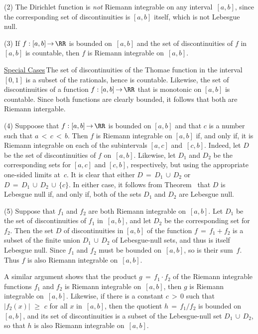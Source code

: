 \V

        (2) The Dirichlet function is {\em not} Riemann integrable on any interval~$[a,b]$, since the corresponding set of discontinuities is $[a,b]$ itself, which is not Lebesgue null.

\V

        (3) If $f:[a,b] \,{\rightarrow}\, {\RR}$ is bounded on~$[a,b]$ and the set of discontinuities of $f$ in~$[a,b]$ is countable, then $f$ is Riemann integrable on~$[a,b]$.

        \underline{Special Cases}\,The set of discontinuities of the Thomae function in the interval $[0,1]$ is a subset of the rationals, hence is countable.
    Likewise, the set of discontinuities of a function $f:[a,b] \,{\rightarrow}\, {\RR}$ that is monotonic on $[a,b]$ is countable.
    Since both functions are clearly bounded, it follows that both are Riemann intergable.

\V

        (4) Suppoose that $f:[a,b] \,{\rightarrow}\, {\RR}$ is bounded on $[a,b]$ and that $c$ is a number such that $a\,<\,c\,<\,b$.
    Then $f$ is Riemann integrable on $[a,b]$ if, and only if, it is Riemann integrable on each of the subintervals $[a,c]$ and~$[c,b]$.
    Indeed, let $D$ be the  set of discontinuities of $f$ on~$[a,b]$. Likewise, let $D_{1}$ and $D_{2}$ be the corresponding sets for $[a,c]$ and $[c,b]$,
    respectively, but using the appropriate one-sided limits at~$c$. It is clear that either $D \,=\, D_{1}\,{\cup}\,D_{2}$ or $D \,=\, D_{1}\,{\cup}\,D_{2}\,{\cup}\,\{c\}$.
    In either case, it follows from Theorem~ that $D$ is Lebesgue null if, and only if, both of the sets $D_{1}$ and $D_{2}$ are Lebesgue null.

\V

        (5) Suppose that $f_{1}$ and $f_{2}$ are both Riemann integrable on~$[a,b]$. Let $D_{1}$ be the set of discontinuities of $f_{1}$ in~$[a,b]$, and let $D_{2}$ be the corresponding set for $f_{2}$.
    Then the set $D$ of discontinuities in $[a,b]$ of the function $f \,=\, f_{1} + f_{2}$ is a subset of the finite union $D_{1}\,{\cup}\,D_{2}$ of Lebesgue-null sets, and thus is itself Lebesgue null.
    Since $f_{1}$ and $f_{2}$ must be bounded on~$[a,b]$, so is their sum~$f$. Thus $f$ is also Riemann integrable on~$[a,b]$.

    A similar argument shows that the product $g \,=\, f_{1}{\cdot}f_{2}$ of the Riemann integrable functions $f_{1}$ and $f_{2}$ is Riemann integrable on~$[a,b]$, then $g$ is Riemann integrable on~$[a,b]$.
    Likewise, if there is a constant $c\,>\,0$ such that $|f_{2}(x)|\,\,{\geq}\,\,c$ for all $x$ in~$[a,b]$, then the quotient $h \,=\, f_{1}/f_{2}$ is bounded on $[a,b]$,
    and its set of discontinuities is a subset of the Lebesgue-null set $D_{1}\,{\cup}\,D_{2}$, so that $h$ is also Riemann integrable on~$[a,b]$.

